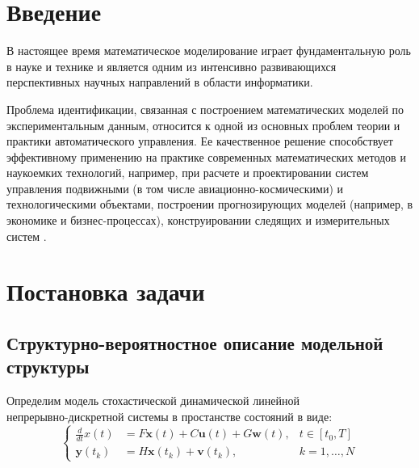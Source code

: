 \documentclass[a4paper,14pt]{extarticle}
\begin{document}
\tableofcontents

\newpage

\section*{Введение}

В настоящее время математическое моделирование играет фундаментальную роль в
науке и технике и является одним из интенсивно развивающихся перспективных
научных направлений в области информатики.

Проблема идентификации, связанная с построением математических моделей по
экспериментальным данным, относится к одной из основных проблем теории и
практики автоматического управления. Ее качественное решение способствует
эффективному применению на практике современных математических методов и
наукоемких технологий, например, при расчете и проектировании систем управления
подвижными (в том числе авиационно-космическими) и технологическими объектами,
построении прогнозирующих моделей (например, в экономике и бизнес-процессах),
конструировании следящих и измерительных систем \cite{denisov}.

\section{Постановка задачи}

\subsection[Структурно-вероятностное описание модельной структуры]
{Структурно-вероятностное описание модельной \\структуры}

\renewcommand{\vec}[1]{\mathbf{#1}}

Определим модель стохастической динамической линейной \\непрерывно-дискретной
системы в простанстве состояний в виде:
\begin{equation}
	\label{eq:initmod}
	\left\{ 
		\begin{array}{lll}
			\frac{d}{dt}x(t) &= F \vec{x}(t) + C \vec{u}(t) + G \vec{w}(t),
				& t \in [t_0,T] \\ 
			\vec{y}(t_k)           &= H \vec{x}(t_k) + \vec{v}(t_k), 
				& k = 1,\ldots, N
		\end{array} 
	\right. 
\end{equation}
\end{document}
